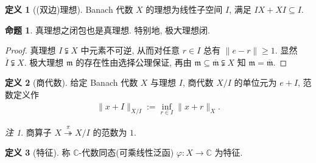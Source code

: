 \documentclass{MainStyle}
\theoremstyle{definition}
\theoremstyle{definition}
\theoremstyle{definition}
\newtheorem{definition}{定义}
\theoremstyle{definition}
\newtheorem{proposition}{命题}
\theoremstyle{definition}
\theoremstyle{definition}
\theoremstyle{definition}
\theoremstyle{remark}
\newtheorem{remark}{注}
\theoremstyle{remark}
\begin{document}
\begin{definition}[(双边)理想]
    Banach 代数 $X$ 的理想为线性子空间 $I$, 满足 $IX+XI\subseteq I$.
\end{definition}

\begin{proposition}
    真理想之闭包也是真理想. 特别地, 极大理想闭.
    \begin{proof}
        真理想 $I\subsetneqq X$ 中元素不可逆, 从而对任意 $r\in I$ 总有 $\|e-r\|\geq 1$. 显然 $\overline I\subsetneqq X$. 极大理想 $\mathfrak m$ 的存在性由选择公理保证, 再由 $\mathfrak m\subseteq \overline{\mathfrak m}\subsetneqq X$ 知 $\mathfrak m=\overline{\mathfrak m}$.
    \end{proof}
\end{proposition}

\begin{definition}[商代数]
    给定 Banach 代数 $X$ 与理想 $I$, 商代数 $X/I$ 的单位元为 $e+I$, 范数定义作
    \begin{align*}
        \|x+I\|_{X/I}:=\inf_{r\in I}\|x+r\|_X.
    \end{align*}
\end{definition}

\begin{remark}
    商算子 $X\overset \pi \twoheadrightarrow X/I$ 的范数为 $1$.
\end{remark}

\begin{definition}[特征]
    称 $\mathbb C$-代数同态(可乘线性泛函) $\varphi: X\to \mathbb C$ 为特征.
\end{definition}
\end{document}
